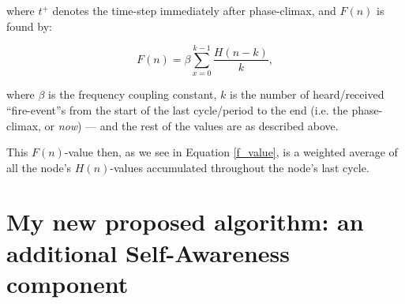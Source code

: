 			where $t^+$ denotes the time-step immediately after phase-climax, and $F(n)$ is found by:
			
			\begin{equation}
			\label{f_value}
				F(n) = \beta\sum_{x=0}^{k-1}\frac{H(n-k)}{k},
			\end{equation}
			
			where $\beta$ is the frequency coupling constant, $k$ is the number of heard/received ``fire-event''s from the start of the last cycle/period to the end (i.e. the phase-climax, or \textit{now}) — and the rest of the values are as described above.
			
			This $F(n)$-value then, as we see in Equation \eqref{f_value}, is a weighted average of all the node's $H(n)$-values accumulated throughout the node's last cycle.

\section{My new proposed algorithm: an additional Self-Awareness component}
